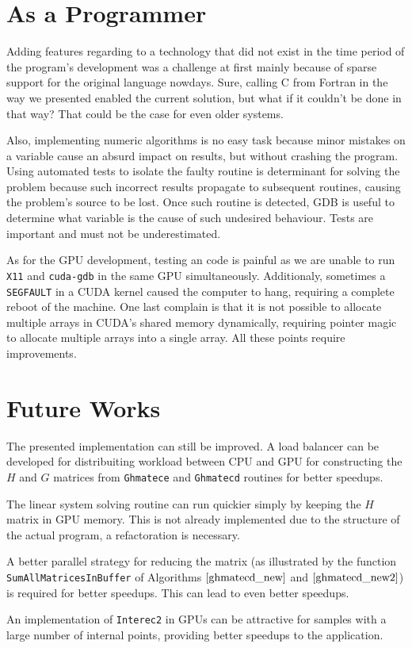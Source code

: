\section{As a Programmer}

Adding features regarding to a technology that did not exist in the time period of the program's 
development was a challenge at first mainly because of sparse support for the original language nowdays. 
Sure, calling C from Fortran in the way we presented enabled the current solution, 
but what if it couldn't be done in that way? That could be the case for even older systems.

Also, implementing numeric algorithms is no easy task because minor mistakes on a variable cause an 
absurd impact on results, but without crashing the program. Using automated tests to isolate the 
faulty routine is determinant for solving the problem because such incorrect results propagate to 
subsequent routines, causing the problem's source to be lost. Once such routine is detected, GDB 
is useful to determine what variable is the cause of such undesired behaviour. Tests are important 
and must not be underestimated.

As for the GPU development, testing an code is painful as we are unable to run \texttt{X11} and \texttt{cuda-gdb} 
in the same GPU  simultaneously. Additionaly, sometimes a \texttt{SEGFAULT} in a CUDA kernel caused the computer 
to hang, requiring a complete reboot of the machine. 
One last complain is that it is not possible to allocate multiple arrays in CUDA's shared memory dynamically, 
requiring pointer magic to allocate multiple arrays into a single array. All these points require improvements. 

\section{Future Works}

The presented implementation can still be improved. A load balancer can be developed for 
distribuiting workload between CPU and GPU for constructing the $H$ and $G$ matrices from 
\texttt{Ghmatece} and \texttt{Ghmatecd} routines for better speedups.  

The linear system solving routine can run quickier simply by keeping the $H$ 
matrix in GPU memory. This is not already implemented due to the structure of the actual 
program, a refactoration is necessary.

A better parallel strategy for reducing the matrix (as illustrated by the function \newline 
\texttt{SumAllMatricesInBuffer} of Algorithms $\ref{ghmatecd_new}$ and $\ref{ghmatecd_new2}$) is 
required for better speedups. This can lead to even better speedups.

An implementation of \texttt{Interec2} in GPUs can be attractive for samples with a large number 
of internal points, providing better speedups to the application.

